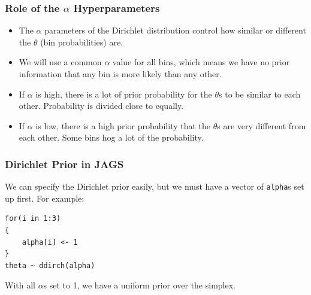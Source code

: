 \documentclass{beamer}
\begin{document}
\begin{frame}[fragile]
\frametitle{Role of the $\alpha$ Hyperparameters}
\begin{itemize}
\item The $\alpha$ parameters of the Dirichlet distribution control how similar
or different the $\theta$ (bin probabilities) are.\pause
\item We will use a common $\alpha$ value for all bins, which means we have no
prior information that any bin is more likely than any other.\pause
\item If $\alpha$ is high, there is a lot of prior probability for the
$\theta$s to be similar to each other. Probability is divided close to equally.\pause
\item If $\alpha$ is low, there is a high prior probability that the $\theta$s
are very different from each other. Some bins hog a lot of the probability.
\end{itemize}


\end{frame}

\begin{frame}[fragile]
\frametitle{Dirichlet Prior in JAGS}
We can specify the Dirichlet prior easily, but we must have a vector of
\texttt{alpha}s set up first. For example:

\begin{verbatim}
for(i in 1:3)
{
    alpha[i] <- 1
}
theta ~ ddirch(alpha)
\end{verbatim}
\pause

With all $\alpha$s set to 1, we have a uniform prior over the simplex.
\end{frame}
\end{document}
